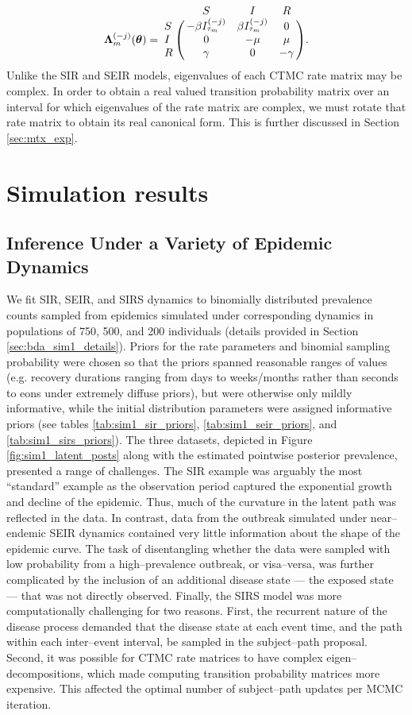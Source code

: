 \begin{equation} \bLambda_m^{(-j)}(\btheta) = \bordermatrix{ & S & I & R \cr
	S & -\beta I_{\tau_m}^{(-j)} & \beta I_{\tau_m}^{(-j)} & 0  \cr 
	I & 0 & -\mu & \mu \cr
	R & \gamma & 0 & -\gamma }.
\end{equation}
Unlike the SIR and SEIR models, eigenvalues of each CTMC rate matrix may be complex. In order to obtain a real valued transition probability matrix over an interval for which eigenvalues of the rate matrix are complex, we must rotate that rate matrix to obtain its real canonical form. This is further discussed in Section \ref{sec:mtx_exp}.

\section{Simulation results}
\label{sec:bda_simulations}

\subsection{Inference Under a Variety of Epidemic Dynamics}
\label{subsec:bda_sir_seir_sirs_sim}
We fit SIR, SEIR, and SIRS dynamics to binomially distributed prevalence counts sampled from epidemics simulated under corresponding dynamics in populations of 750, 500, and 200 individuals (details provided in Section \ref{sec:bda_sim1_details}). Priors for the rate parameters and binomial sampling probability were chosen so that the priors spanned reasonable ranges of values (e.g. recovery durations ranging from days to weeks/months rather than seconds to eons under extremely diffuse priors), but were otherwise only mildly informative, while the initial distribution parameters were assigned informative priors (see tables \ref{tab:sim1_sir_priors}, \ref{tab:sim1_seir_priors}, and \ref{tab:sim1_sirs_priors}). The three datasets, depicted in Figure \ref{fig:sim1_latent_posts} along with the estimated pointwise posterior prevalence, presented a range of challenges. The SIR example was arguably the most ``standard'' example as the observation period captured the exponential growth and decline of the epidemic. Thus, much of the curvature in the latent path was reflected in the data. In contrast, data from the outbreak simulated under near--endemic SEIR dynamics contained very little information about the shape of the epidemic curve. The task of disentangling whether the data were sampled with low probability from a high--prevalence outbreak, or visa--versa, was further complicated by the inclusion of an additional disease state --- the exposed state --- that was not directly observed. Finally, the SIRS model was more computationally challenging for two reasons. First, the recurrent nature of the disease process demanded that the disease state at each event time, and the path within each inter--event interval, be sampled in the subject--path proposal. Second, it was possible for CTMC rate matrices to have complex eigen--decompositions, which made computing transition probability matrices more expensive. This affected the optimal number of subject--path updates per MCMC iteration.

